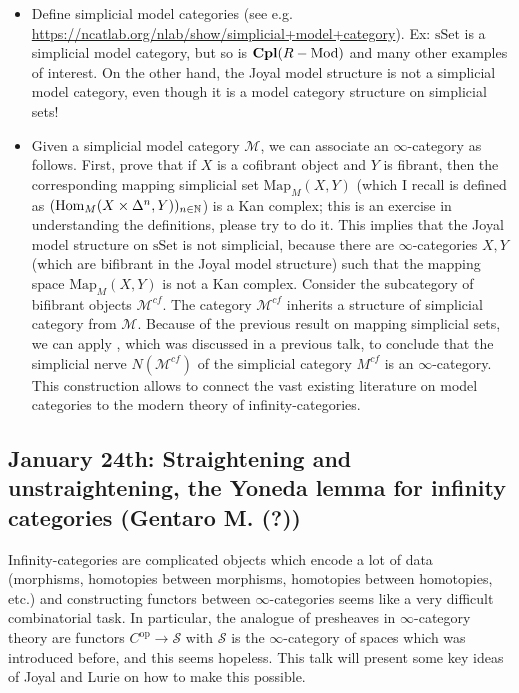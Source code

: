 \documentclass{amsart}
\theoremstyle{definition}
\theoremstyle{remark}
\newcommand{\Hom}{\mathop{\rm Hom}\nolimits}
\newcommand{\ra}{\rightarrow}
\newcommand{\Cpl}{\mathop{\mathbf{Cpl}}\nolimits}
\newcommand{\Mod}{\rm Mod}
\newcommand{\op}{\mathrm{op}}
\newcommand{\sSet}{\mathrm{sSet}}
\begin{document}
\begin{itemize}
\item Define simplicial model categories (see e.g. \url{https://ncatlab.org/nlab/show/simplicial+model+category}). Ex: $\sSet$ is a simplicial model category, but so is $\Cpl(R-\Mod)$ and many other examples of interest. On the other hand, the Joyal model structure is not a simplicial model category, even though it is a model category structure on simplicial sets!
\item Given a simplicial model category $\mathcal{M}$, we can associate an $\infty$-category as follows. First, prove that if $X$ is a cofibrant object and $Y$ is fibrant, then the corresponding mapping simplicial set $\mathrm{Map}_{M}(X,Y)$ (which I recall is defined as $(\Hom_{M}(X\times \Delta^{n},Y))_{n\in\mathbb{N}}$) is a Kan complex; this is an exercise in understanding the definitions, please try to do it. This implies that the Joyal model structure on $\sSet$ is not simplicial, because there are $\infty$-categories $X,Y$ (which are bifibrant in the Joyal model structure) such that the mapping space $\mathrm{Map}_{M}(X,Y)$ is not a Kan complex. Consider the subcategory of bifibrant objects $\mathcal{M}^{cf}$. The category $\mathcal{M}^{cf}$ inherits a structure of simplicial category from $\mathcal{M}$. Because of the previous result on mapping simplicial sets, we can apply \cite[Prop. 1.1.5.10]{HTT}, which was discussed in a previous talk, to conclude that the simplicial nerve $N(\mathcal{M}^{cf})$ of the simplicial category $M^{cf}$ is an $\infty$-category. This construction allows to connect the vast existing literature on model categories to the modern theory of infinity-categories.
\end{itemize}  

\subsection{January 24th: Straightening and unstraightening, the Yoneda lemma for infinity categories (Gentaro M. (?))
}

Infinity-categories are complicated objects which encode a lot of data (morphisms, homotopies between morphisms, homotopies between homotopies, etc.) and constructing functors between $\infty$-categories seems like a very difficult combinatorial task. In particular, the analogue of presheaves in $\infty$-category theory are functors $C^{\op}\ra \mathcal{S}$ with $\mathcal{S}$ is the $\infty$-category of spaces which was introduced before, and this seems hopeless. This talk will present some key ideas of Joyal and Lurie on how to make this possible.
\end{document}
